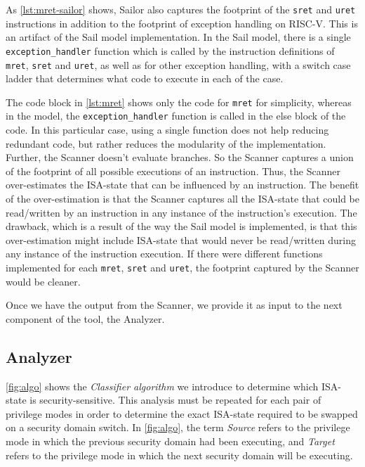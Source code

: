 As \autoref{lst:mret-sailor} shows, Sailor also captures the footprint of the \texttt{sret} and \texttt{uret} instructions in addition to the footprint of exception handling on RISC-V. 
This is an artifact of the Sail model implementation. 
In the Sail model, there is a single \texttt{exception\_handler} function which is called by the instruction definitions of \texttt{mret}, \texttt{sret} and \texttt{uret}, as well as for other exception handling, with a switch case ladder that determines what code to execute in each of the case. 



The code block in \autoref{lst:mret} shows only the code for \texttt{mret} for simplicity, whereas in the model, the \texttt{exception\_handler} function is called in the else block of the code. 
In this particular case, using a single function does not help reducing redundant code, but rather reduces the modularity of the implementation. 
Further, the Scanner doesn't evaluate branches. 
So the Scanner captures a union of the footprint of all possible executions of an instruction. 
Thus, the Scanner over-estimates the ISA-state that can be influenced by an instruction. 
The benefit of the over-estimation is that the Scanner captures all the ISA-state that could be read/written by an instruction in any instance of the instruction's execution.
The drawback, which is a result of the way the Sail model is implemented, is that this over-estimation might include ISA-state that would never be read/written during any instance of the instruction execution. 
If there were different functions implemented for each \texttt{mret}, \texttt{sret} and \texttt{uret}, the footprint captured by the Scanner would be cleaner. 

Once we have the output from the Scanner, we provide it as input to the next component of the  tool, \ie{} the Analyzer. 


\subsection{Analyzer} 
\label{sec:analyzer}



\autoref{fig:algo} shows the \textit{Classifier algorithm} we introduce to determine which ISA-state is security-sensitive. 
This analysis must be repeated for each pair of privilege modes in order to determine the exact ISA-state required to be swapped on a security domain switch. 
In \autoref{fig:algo}, the term \textit{Source} refers to the privilege mode in which the previous security domain had been executing, and \textit{Target} refers to the privilege mode in which the next security domain will be executing. 

